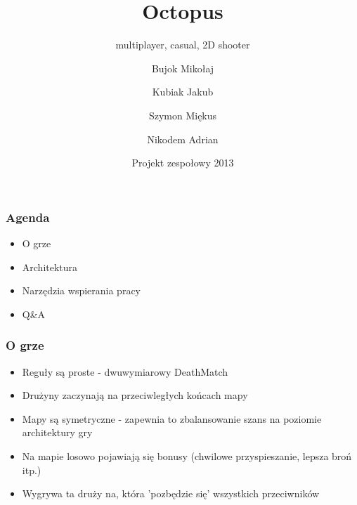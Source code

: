 \documentclass{beamer}
\title
{Octopus}
\subtitle{multiplayer, casual, 2D shooter}
\author[]
{Bujok Mikołaj \and Kubiak Jakub \\ \and Szymon Miękus\and Nikodem Adrian}
\date[\today]
{Projekt zespołowy 2013}
\begin{document}
\frame{\titlepage}
\begin{frame}
  \frametitle{Agenda}
  \begin{itemize}
  \item O grze
  \item Architektura
  \item Narzędzia wspierania pracy
  \item Q\&A
  \end{itemize}
\end{frame}

\begin{frame}
  \frametitle{O grze}
  \begin{itemize}
    \item Reguły są proste - dwuwymiarowy DeathMatch
    \item Drużyny zaczynają na przeciwległych końcach mapy
    \item Mapy są symetryczne - zapewnia to zbalansowanie
          szans na poziomie architektury gry
    \item Na mapie losowo pojawiają się bonusy (chwilowe przyspieszanie, lepsza broń itp.)
    \item Wygrywa ta druży
      na, która 'pozbędzie się' wszystkich przeciwników
  \end{itemize}
\end{frame}
\end{document}
